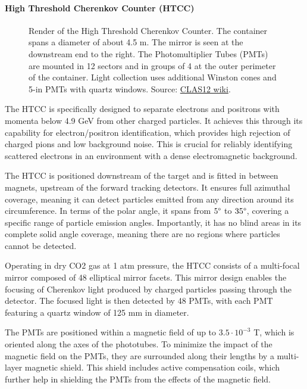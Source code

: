 \paragraph{High Threshold Cherenkov Counter (HTCC)}
    \begin{wrapfigure}{l}{0.50\textwidth}
        \centering{}
        \caption[HTCC]{Render of the High Threshold Cherenkov Counter.
        The container spans a diameter of about 4.5 m. The mirror is seen at the downstream end to the right.
        The Photomultiplier Tubes (PMTs) are mounted in 12 sectors and in groups of 4 at the outer perimeter of the container.
        Light collection uses additional Winston cones and 5-in PMTs with quartz windows.
        Source: \hyperlink{jlab.org/physics/hall-b/clas12}{CLAS12 wiki}.}
        \label{fig::11.211::htcc}
    \end{wrapfigure}

    The HTCC is specifically designed to separate electrons and positrons with momenta below 4.9 GeV from other charged particles.
    It achieves this through its capability for electron/positron identification, which provides high rejection of charged pions and low background noise.
    This is crucial for reliably identifying scattered electrons in an environment with a dense electromagnetic background.

    The HTCC is positioned downstream of the target and is fitted in between magnets, upstream of the forward tracking detectors.
    It ensures full azimuthal coverage, meaning it can detect particles emitted from any direction around its circumference.
    In terms of the polar angle, it spans from $5\degree$ to $35\degree$, covering a specific range of particle emission angles.
    Importantly, it has no blind areas in its complete solid angle coverage, meaning there are no regions where particles cannot be detected.

    Operating in dry CO2 gas at 1 atm pressure, the HTCC consists of a multi-focal mirror composed of 48 elliptical mirror facets.
    This mirror design enables the focusing of Cherenkov light produced by charged particles passing through the detector.
    The focused light is then detected by 48 PMTs, with each PMT featuring a quartz window of 125 mm in diameter.

    The PMTs are positioned within a magnetic field of up to $3.5\cdot 10^{-3}$ T, which is oriented along the axes of the phototubes.
    To minimize the impact of the magnetic field on the PMTs, they are surrounded along their lengths by a multi-layer magnetic shield.
    This shield includes active compensation coils, which further help in shielding the PMTs from the effects of the magnetic field.

